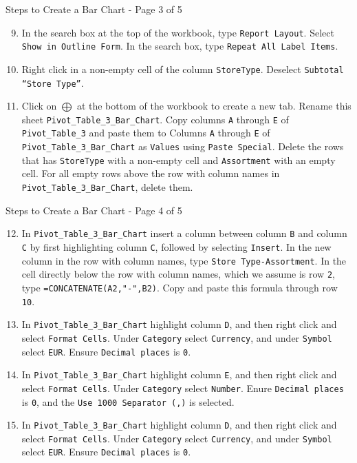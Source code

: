 \documentclass[pdf]{beamer}
\theoremstyle{remark}
\theoremstyle{definition}
\begin{document}
\begin{frame}[t]{Steps to Create a Bar Chart - Page 3 of 5}
 \small 
\begin{enumerate}
  \setcounter{enumi}{8}
\item In the search box at the top of the workbook, type \texttt{Report Layout}. Select \texttt{Show in Outline Form}.  In the search box, type \texttt{Repeat All Label Items}.
\item Right click in a non-empty cell of the column \texttt{StoreType}. Deselect \texttt{Subtotal ``Store Type''}.
\item Click on \texttt{$\bigoplus$} at the bottom of the workbook to create a new tab.  Rename this sheet \texttt{Pivot\_Table\_3\_Bar\_Chart}.  Copy columns \texttt{A} through \texttt{E} of \texttt{Pivot\_Table\_3} and paste them to Columns \texttt{A} through \texttt{E} of \texttt{Pivot\_Table\_3\_Bar\_Chart}  as \texttt{Values} using \texttt{Paste Special}.  Delete the rows that has \texttt{StoreType} with a non-empty cell and \texttt{Assortment} with an empty cell. For all empty rows above the row with column names in \texttt{Pivot\_Table\_3\_Bar\_Chart}, delete them.  
\end{enumerate}
\end{frame}

\begin{frame}[t]{Steps to Create a Bar Chart - Page 4 of 5}
 \small 
\begin{enumerate}
  \setcounter{enumi}{11}
\item In \texttt{Pivot\_Table\_3\_Bar\_Chart} insert a column between column \texttt{B} and column \texttt{C} by first highlighting column \texttt{C}, followed by selecting \texttt{Insert}. In the new column in the row with column names, type \texttt{Store Type-Assortment}.  In the cell directly below the row with column names, which we assume is row \texttt{2}, type \texttt{=CONCATENATE(A2,"-",B2)}.  Copy and paste this formula through row \texttt{10}.
\item In  \texttt{Pivot\_Table\_3\_Bar\_Chart} highlight column \texttt{D}, and then right click and select \texttt{Format Cells}.   Under \texttt{Category} select \texttt{Currency}, and under \texttt{Symbol} select \texttt{EUR}. Ensure \texttt{Decimal places} is \texttt{0}.
\item In  \texttt{Pivot\_Table\_3\_Bar\_Chart} highlight column \texttt{E}, and then right click and select \texttt{Format Cells}.   Under \texttt{Category} select \texttt{Number}.  Enure \texttt{Decimal places} is \texttt{0}, and the \texttt{Use 1000 Separator (,)} is selected. 
\item In  \texttt{Pivot\_Table\_3\_Bar\_Chart} highlight column \texttt{D}, and then right click and select \texttt{Format Cells}.   Under \texttt{Category} select \texttt{Currency}, and under \texttt{Symbol} select \texttt{EUR}. Ensure \texttt{Decimal places} is \texttt{0}. 
\end{enumerate}
\end{frame}
\end{document}
